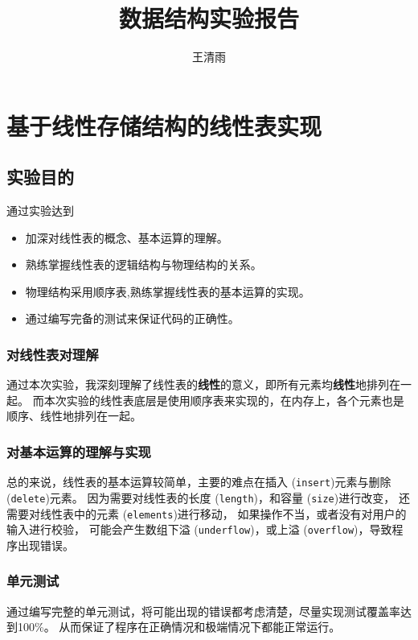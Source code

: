 \documentclass[format=draft,language=chinese,category=academic-report]{hustreport}
\title{数据结构实验报告}
\author{王清雨}
\begin{document}
\frontmatter
\maketitle
\makeabstract
\tableofcontents
\listoffigures
\listoftables
\mainmatter

\chapter{基于线性存储结构的线性表实现}\label{chapter:1}

\section{实验目的}\label{sec:1}
通过实验达到
\begin{itemize}
    \item 加深对线性表的概念、基本运算的理解。
    \item 熟练掌握线性表的逻辑结构与物理结构的关系。
    \item 物理结构采用顺序表,熟练掌握线性表的基本运算的实现。
    \item 通过编写完备的测试来保证代码的正确性。
\end{itemize}

\subsection{对线性表对理解}
通过本次实验，我深刻理解了线性表的\textbf{线性}的意义，即所有元素均\textbf{线性}地排列在一起。
\newline
而本次实验的线性表底层是使用顺序表来实现的，在内存上，各个元素也是顺序、线性地排列在一起。
\subsection{对基本运算的理解与实现}
总的来说，线性表的基本运算较简单，主要的难点在插入 (\texttt{insert})元素与删除 (\texttt{delete})元素。
因为需要对线性表的长度 (\texttt{length})，和容量 (\texttt{size})进行改变，
还需要对线性表中的元素 (\texttt{elements})进行移动，
如果操作不当，或者没有对用户的输入进行校验，
可能会产生数组下溢 (\texttt{underflow})，或上溢 (\texttt{overflow})，导致程序出现错误。
\subsection{单元测试}
通过编写完整的单元测试，将可能出现的错误都考虑清楚，尽量实现测试覆盖率达到100\%。
从而保证了程序在正确情况和极端情况下都能正常运行。
\end{document}
